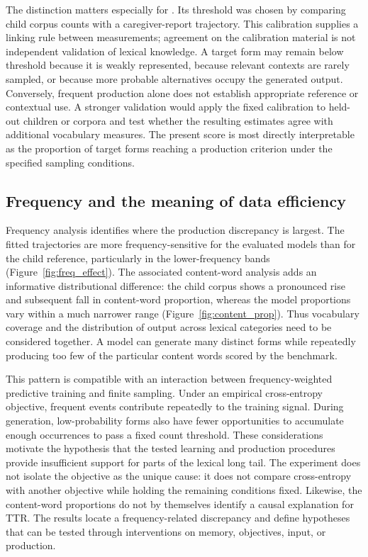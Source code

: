 The distinction matters especially for \meCDI{}. Its threshold was chosen by comparing child corpus counts with a caregiver-report trajectory. This calibration supplies a linking rule between measurements; agreement on the calibration material is not independent validation of lexical knowledge. A target form may remain below threshold because it is weakly represented, because relevant contexts are rarely sampled, or because more probable alternatives occupy the generated output. Conversely, frequent production alone does not establish appropriate reference or contextual use. A stronger validation would apply the fixed calibration to held-out children or corpora and test whether the resulting estimates agree with additional vocabulary measures. The present score is most directly interpretable as the proportion of target forms reaching a production criterion under the specified sampling conditions.

\subsection{Frequency and the meaning of data efficiency}

Frequency analysis identifies where the production discrepancy is largest. The fitted trajectories are more frequency-sensitive for the evaluated models than for the child reference, particularly in the lower-frequency bands (Figure~\ref{fig:freq_effect}). The associated content-word analysis adds an informative distributional difference: the child corpus shows a pronounced rise and subsequent fall in content-word proportion, whereas the model proportions vary within a much narrower range (Figure~\ref{fig:content_prop}). Thus vocabulary coverage and the distribution of output across lexical categories need to be considered together. A model can generate many distinct forms while repeatedly producing too few of the particular content words scored by the benchmark.

This pattern is compatible with an interaction between frequency-weighted predictive training and finite sampling. Under an empirical cross-entropy objective, frequent events contribute repeatedly to the training signal. During generation, low-probability forms also have fewer opportunities to accumulate enough occurrences to pass a fixed count threshold. These considerations motivate the hypothesis that the tested learning and production procedures provide insufficient support for parts of the lexical long tail. The experiment does not isolate the objective as the unique cause: it does not compare cross-entropy with another objective while holding the remaining conditions fixed. Likewise, the content-word proportions do not by themselves identify a causal explanation for TTR. The results locate a frequency-related discrepancy and define hypotheses that can be tested through interventions on memory, objectives, input, or production.

